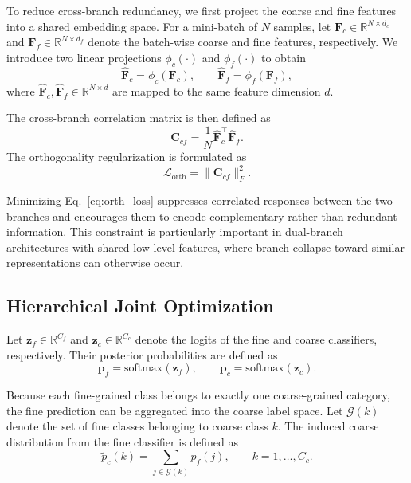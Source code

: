 \documentclass[pdflatex,iicol,sn-mathphys-num]{sn-jnl}
\theoremstyle{thmstyleone}%
\theoremstyle{thmstyletwo}%
\theoremstyle{thmstylethree}%
\begin{document}
To reduce cross-branch redundancy, we first project the coarse and fine features into a shared embedding space. 
For a mini-batch of $N$ samples, let $\mathbf{F}_c \in \mathbb{R}^{N \times d_c}$ and $\mathbf{F}_f \in \mathbb{R}^{N \times d_f}$ denote the batch-wise coarse and fine features, respectively. 
We introduce two linear projections $\phi_c(\cdot)$ and $\phi_f(\cdot)$ to obtain
\begin{equation}
\hat{\mathbf{F}}_c = \phi_c(\mathbf{F}_c), \qquad
\hat{\mathbf{F}}_f = \phi_f(\mathbf{F}_f),
\end{equation}
where $\hat{\mathbf{F}}_c, \hat{\mathbf{F}}_f \in \mathbb{R}^{N \times d}$ are mapped to the same feature dimension $d$.

The cross-branch correlation matrix is then defined as
\begin{equation}
\mathbf{C}_{cf} = \frac{1}{N}\hat{\mathbf{F}}_c^\top \hat{\mathbf{F}}_f.
\end{equation}
The orthogonality regularization is formulated as
\begin{equation}
\mathcal{L}_{\text{orth}} = \|\mathbf{C}_{cf}\|_F^2.
\label{eq:orth_loss}
\end{equation}

Minimizing Eq.~\eqref{eq:orth_loss} suppresses correlated responses between the two branches and encourages them to encode complementary rather than redundant information. 
This constraint is particularly important in dual-branch architectures with shared low-level features, where branch collapse toward similar representations can otherwise occur.

\subsection{Hierarchical Joint Optimization}

Let $\mathbf{z}_f \in \mathbb{R}^{C_f}$ and $\mathbf{z}_c \in \mathbb{R}^{C_c}$ denote the logits of the fine and coarse classifiers, respectively. 
Their posterior probabilities are defined as
\begin{equation}
\mathbf{p}_f = \mathrm{softmax}(\mathbf{z}_f), \qquad
\mathbf{p}_c = \mathrm{softmax}(\mathbf{z}_c).
\end{equation}

Because each fine-grained class belongs to exactly one coarse-grained category, the fine prediction can be aggregated into the coarse label space. 
Let $\mathcal{G}(k)$ denote the set of fine classes belonging to coarse class $k$. 
The induced coarse distribution from the fine classifier is defined as
\begin{equation}
\tilde{p}_c(k) = \sum_{j \in \mathcal{G}(k)} p_f(j), \qquad k=1,\dots,C_c.
\label{eq:fine_to_coarse}
\end{equation}
\end{document}
